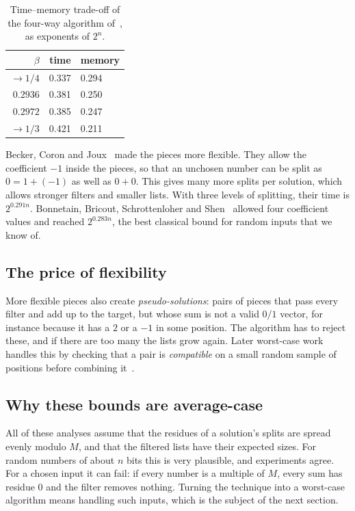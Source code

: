 \documentclass[11pt]{article}
\begin{document}
\begin{table}[t]
\centering
\caption{Time--memory trade-off of the four-way algorithm of~\cite{hgj}, as
exponents of $2^n$.}
\label{tab:hgj}
\small
\begin{tabular}{rrl}
\toprule
$\beta$ & time & memory \\
\midrule
$\to1/4$ & 0.337 & 0.294 \\
$0.2936$ & 0.381 & 0.250 \\
$0.2972$ & 0.385 & 0.247 \\
$\to1/3$ & 0.421 & 0.211 \\
\bottomrule
\end{tabular}
\end{table}

Becker, Coron and Joux~\cite{bcj} made the pieces more flexible. They allow
the coefficient $-1$ inside the pieces, so that an unchosen number can be split
as $0=1+(-1)$ as well as $0+0$. This gives many more splits per solution, which
allows stronger filters and smaller lists. With three levels of splitting,
their time is $2^{0.291n}$. Bonnetain, Bricout, Schrottenloher and
Shen~\cite{bbss} allowed four coefficient values and reached $2^{0.283n}$, the
best classical bound for random inputs that we know of.

\subsection{The price of flexibility}
More flexible pieces also create \emph{pseudo-solutions}: pairs of pieces that
pass every filter and add up to the target, but whose sum is not a valid
$0/1$ vector, for instance because it has a $2$ or a $-1$ in some position.
The algorithm has to reject these, and if there are too many the lists grow
again. Later worst-case work handles this by checking that a pair is
\emph{compatible} on a small random sample of positions before combining
it~\cite{rw}.

\subsection{Why these bounds are average-case}
All of these analyses assume that the residues of a solution's splits are
spread evenly modulo $M$, and that the filtered lists have their expected
sizes. For random numbers of about $n$ bits this is very plausible, and
experiments agree. For a chosen input it can fail: if every number is a
multiple of $M$, every sum has residue $0$ and the filter removes nothing.
Turning the technique into a worst-case algorithm means handling such inputs,
which is the subject of the next section.
\end{document}
